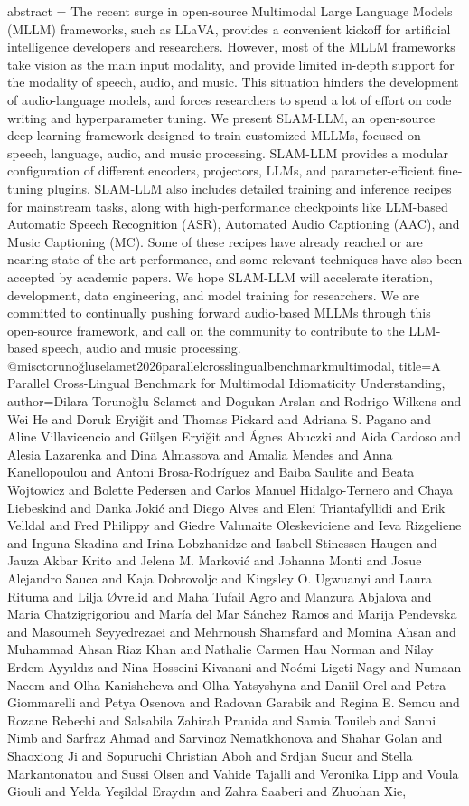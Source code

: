 {      abstract = {The recent surge in open-source Multimodal Large Language Models (MLLM) frameworks, such as LLaVA, provides a convenient kickoff for artificial intelligence developers and researchers. However, most of the MLLM frameworks take vision as the main input modality, and provide limited in-depth support for the modality of speech, audio, and music. This situation hinders the development of audio-language models, and forces researchers to spend a lot of effort on code writing and hyperparameter tuning. We present SLAM-LLM, an open-source deep learning framework designed to train customized MLLMs, focused on speech, language, audio, and music processing. SLAM-LLM provides a modular configuration of different encoders, projectors, LLMs, and parameter-efficient fine-tuning plugins. SLAM-LLM also includes detailed training and inference recipes for mainstream tasks, along with high-performance checkpoints like LLM-based Automatic Speech Recognition (ASR), Automated Audio Captioning (AAC), and Music Captioning (MC). Some of these recipes have already reached or are nearing state-of-the-art performance, and some relevant techniques have also been accepted by academic papers. We hope SLAM-LLM will accelerate iteration, development, data engineering, and model training for researchers. We are committed to continually pushing forward audio-based MLLMs through this open-source framework, and call on the community to contribute to the LLM-based speech, audio and music processing.}
}@misc{torunoğluselamet2026parallelcrosslingualbenchmarkmultimodal,
      title={A Parallel Cross-Lingual Benchmark for Multimodal Idiomaticity Understanding}, 
      author={Dilara Torunoğlu-Selamet and Dogukan Arslan and Rodrigo Wilkens and Wei He and Doruk Eryiğit and Thomas Pickard and Adriana S. Pagano and Aline Villavicencio and Gülşen Eryiğit and Ágnes Abuczki and Aida Cardoso and Alesia Lazarenka and Dina Almassova and Amalia Mendes and Anna Kanellopoulou and Antoni Brosa-Rodríguez and Baiba Saulite and Beata Wojtowicz and Bolette Pedersen and Carlos Manuel Hidalgo-Ternero and Chaya Liebeskind and Danka Jokić and Diego Alves and Eleni Triantafyllidi and Erik Velldal and Fred Philippy and Giedre Valunaite Oleskeviciene and Ieva Rizgeliene and Inguna Skadina and Irina Lobzhanidze and Isabell Stinessen Haugen and Jauza Akbar Krito and Jelena M. Marković and Johanna Monti and Josue Alejandro Sauca and Kaja Dobrovoljc and Kingsley O. Ugwuanyi and Laura Rituma and Lilja Øvrelid and Maha Tufail Agro and Manzura Abjalova and Maria Chatzigrigoriou and María del Mar Sánchez Ramos and Marija Pendevska and Masoumeh Seyyedrezaei and Mehrnoush Shamsfard and Momina Ahsan and Muhammad Ahsan Riaz Khan and Nathalie Carmen Hau Norman and Nilay Erdem Ayyıldız and Nina Hosseini-Kivanani and Noémi Ligeti-Nagy and Numaan Naeem and Olha Kanishcheva and Olha Yatsyshyna and Daniil Orel and Petra Giommarelli and Petya Osenova and Radovan Garabik and Regina E. Semou and Rozane Rebechi and Salsabila Zahirah Pranida and Samia Touileb and Sanni Nimb and Sarfraz Ahmad and Sarvinoz Nematkhonova and Shahar Golan and Shaoxiong Ji and Sopuruchi Christian Aboh and Srdjan Sucur and Stella Markantonatou and Sussi Olsen and Vahide Tajalli and Veronika Lipp and Voula Giouli and Yelda Yeşildal Eraydın and Zahra Saaberi and Zhuohan Xie},
}
